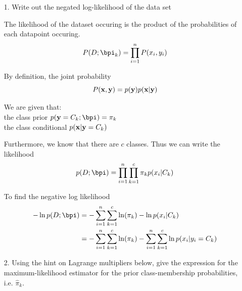 \documentclass[submit]{harvardml}
\newenvironment{answer}{%
    \color{answergreen}\bf}
  {%
  }
\begin{document}
\begin{enumerate}
    \item[1.] Write out the negated log-likelihood of the data set

    \begin{answer}

        The likelihood of the dataset occuring is the product of the
        probabilities of each datapoint occuring.
        $$P(D;\bpi_k) = \prod_{i=1}^n P(x_i, y_i)$$

        By definition, the joint probability
        $$P(\mathbf{x},\mathbf{y}) = p(\mathbf{y}) p(\mathbf{x}|\mathbf{y})$$


        We are given that:  \\
        the class prior $p(\by=C_k; \bpi) = \pi_k$  \\
        the class conditional $p(\mathbf{x}|\mathbf{y} = C_k)$ 

        Furthermore, we know that there are $c$ classes.  Thus we can write the likelihood 
        $$p(D; \bpi) = \prod_{i=1}^n \prod_{k=1}^c \pi_k p(x_i | C_k)$$
       
        To find the negative log likelihood 
        \begin{align*}
            - \ln p(D; \bpi) &= - \sum_{i=1}^n \sum_{k=1}^c \ln(\pi_k) - \ln p(x_i|C_k) \\ 
                &= - \sum_{i=1}^n \sum_{k=1}^c \ln(\pi_k) - \sum_{i=1}^n
                \sum_{k=1}^c \ln p(x_i| y_i = C_k) \\
        \end{align*}
    \end{answer}

    \item[2.]  Using the hint on Lagrange multipliers below, give the
    expression for the maximum-likelihood estimator for the prior
    class-membership probabilities, i.e.  $\hat \pi_k.$

    \begin{answer}


\end{answer}
\end{enumerate}
\end{document}

